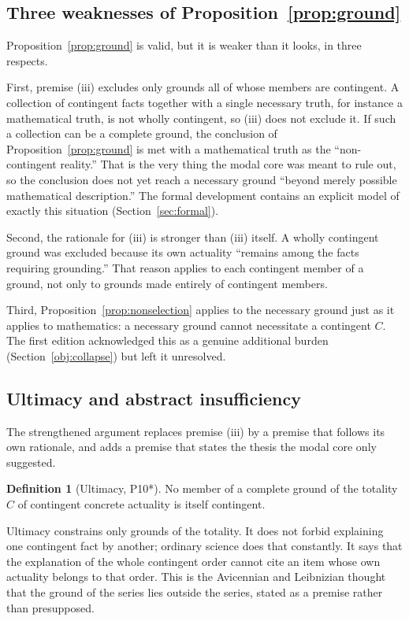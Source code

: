 \documentclass[11pt,letterpaper]{article}
\theoremstyle{plain}
\theoremstyle{definition}
\newtheorem{definition}{Definition}
\begin{document}
\subsection{Three weaknesses of Proposition~\ref{prop:ground}}
\label{sec:weak}

Proposition~\ref{prop:ground} is valid, but it is weaker than it looks, in three respects.

First, premise (iii) excludes only grounds all of whose members are contingent. A collection of contingent facts together with a single necessary truth, for instance a mathematical truth, is not wholly contingent, so (iii) does not exclude it. If such a collection can be a complete ground, the conclusion of Proposition~\ref{prop:ground} is met with a mathematical truth as the ``non-contingent reality.'' That is the very thing the modal core was meant to rule out, so the conclusion does not yet reach a necessary ground ``beyond merely possible mathematical description.'' The formal development contains an explicit model of exactly this situation (Section~\ref{sec:formal}).

Second, the rationale for (iii) is stronger than (iii) itself. A wholly contingent ground was excluded because its own actuality ``remains among the facts requiring grounding.'' That reason applies to each contingent member of a ground, not only to grounds made entirely of contingent members.

Third, Proposition~\ref{prop:nonselection} applies to the necessary ground just as it applies to mathematics: a necessary ground cannot necessitate a contingent $C$. The first edition acknowledged this as a genuine additional burden (Section~\ref{obj:collapse}) but left it unresolved.

\subsection{Ultimacy and abstract insufficiency}

The strengthened argument replaces premise (iii) by a premise that follows its own rationale, and adds a premise that states the thesis the modal core only suggested.

\begin{definition}[Ultimacy, P10*]\label{def:ultimacy}
No member of a complete ground of the totality $C$ of contingent concrete actuality is itself contingent.
\end{definition}

Ultimacy constrains only grounds of the totality. It does not forbid explaining one contingent fact by another; ordinary science does that constantly. It says that the explanation of the whole contingent order cannot cite an item whose own actuality belongs to that order. This is the Avicennian and Leibnizian thought that the ground of the series lies outside the series, stated as a premise rather than presupposed.
\end{document}
